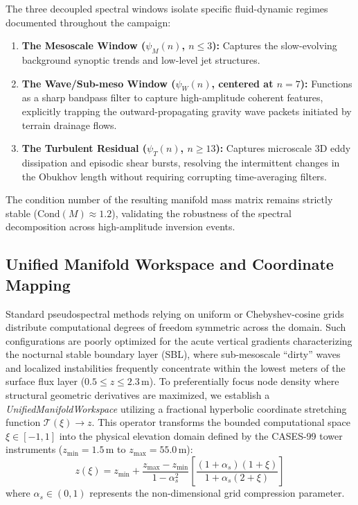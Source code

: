 The three decoupled spectral windows isolate specific fluid-dynamic regimes documented throughout the campaign:
\begin{enumerate}
    \item \textbf{The Mesoscale Window ($\psi_M(n)$, $n \le 3$):} Captures the slow-evolving background synoptic trends and low-level jet structures.
    \item \textbf{The Wave/Sub-meso Window ($\psi_W(n)$, centered at $n = 7$):} Functions as a sharp bandpass filter to capture high-amplitude coherent features, explicitly trapping the outward-propagating gravity wave packets initiated by terrain drainage flows.
    \item \textbf{The Turbulent Residual ($\psi_T(n)$, $n \ge 13$):} Captures microscale 3D eddy dissipation and episodic shear bursts, resolving the intermittent changes in the Obukhov length without requiring corrupting time-averaging filters.
\end{enumerate}
The condition number of the resulting manifold mass matrix remains strictly stable ($\text{Cond}(M) \approx 1.2$), validating the robustness of the spectral decomposition across high-amplitude inversion events.


\subsection{Unified Manifold Workspace and Coordinate Mapping}
\label{sec:methods:manifold}

Standard pseudospectral methods relying on uniform or Chebyshev-cosine grids distribute computational degrees of freedom symmetric across the domain. Such configurations are poorly optimized for the acute vertical gradients characterizing the nocturnal stable boundary layer (SBL), where sub-mesoscale ``dirty'' waves and localized instabilities frequently concentrate within the lowest meters of the surface flux layer ($0.5 \le z \le 2.3\,\text{m}$). To preferentially focus node density where structural geometric derivatives are maximized, we establish a \emph{UnifiedManifoldWorkspace} utilizing a fractional hyperbolic coordinate stretching function $\mathcal{T}(\xi) \rightarrow z$. This operator transforms the bounded computational space $\xi \in [-1, 1]$ into the physical elevation domain defined by the CASES-99 tower instruments ($z_{\min} = 1.5\,\text{m}$ to $z_{\max} = 55.0\,\text{m}$):
\begin{equation}
z(\xi) = z_{\min} + \frac{z_{\max} - z_{\min}}{1 - \alpha_s^2} \left[ \frac{(1+\alpha_s)(1+\xi)}{1 + \alpha_s(2+\xi)} \right]
\label{eq:hyperbolic_stretch}
\end{equation}
where $\alpha_s \in (0, 1)$ represents the non-dimensional grid compression parameter.

